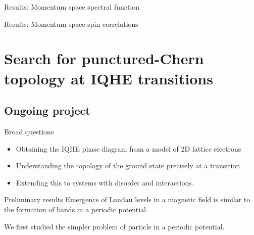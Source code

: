 \documentclass[12pt,aspectratio=169]{beamer}
\begin{document}
\begin{frame}{Results: Momentum space spectral function}
\end{frame}

\begin{frame}{Results: Momentum space spin correlations}
\hspace*{-22pt}
\end{frame}

\section{Search for punctured-Chern topology at IQHE transitions}
\subsection{Ongoing project}

\begin{frame}{Broad questions}

\vspace*{\fill}
\begin{minipage}{0.5\textwidth}
\begin{itemize}[<+->]
	\item Obtaining the \alert{IQHE phase diagram} from a model of 2D lattice electrons\\[10pt]
	\item Understanding the \alert{topology} of the ground state precisely at a transition\\[10pt]
	\item Extending this to systems with \alert{disorder} and interactions.
\end{itemize}
\end{minipage}
\hspace*{\fill}
\begin{minipage}{0.4\textwidth}
\end{minipage}

\vspace*{\fill}
\end{frame}

\begin{frame}{Preliminary results}
Emergence of \alert{Landau levels} in a magnetic field is similar to the formation of \alert{bands} in a periodic potential.

\vspace*{\fill}

\vspace*{\fill}
We first studied the simpler problem of \alert{particle in a periodic potential}.
\end{frame}
\end{document}
